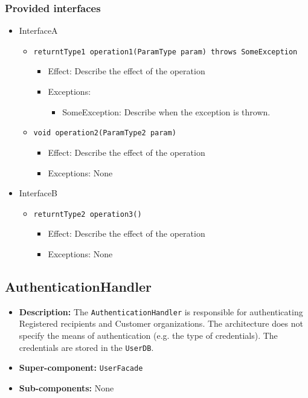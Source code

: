 \documentclass[a4paper,10pt]{article}
\begin{document}
\subsubsection*{Provided interfaces}
\begin{itemize}
    \item InterfaceA
    \begin{itemize}
        \item \texttt{returntType1 operation1(ParamType param) throws SomeException}
        \begin{itemize}
            \item Effect: Describe the effect of the operation
            \item Exceptions:
            \begin{itemize}
                \item SomeException: Describe when the exception is thrown.
            \end{itemize}
		\end{itemize}
        \item \texttt{void operation2(ParamType2 param)}
        \begin{itemize}
            \item Effect: Describe the effect of the operation
            \item Exceptions: None
        \end{itemize}
    \end{itemize}

    \item InterfaceB
    \begin{itemize}
        \item \texttt{returntType2 operation3()}
        \begin{itemize}
            \item Effect: Describe the effect of the operation
            \item Exceptions: None
        \end{itemize}
    \end{itemize}
\end{itemize}


\subsection{AuthenticationHandler}
\begin{itemize}
    \item \textbf{Description:} The \texttt{AuthenticationHandler} is responsible for authenticating Registered recipients and Customer organizations. The architecture does not specify the means of authentication (e.g. the type of credentials). The credentials are stored in the \texttt{UserDB}.
    \item \textbf{Super-component:} \texttt{UserFacade}
    \item \textbf{Sub-components:} None
\end{itemize}
\end{document}
